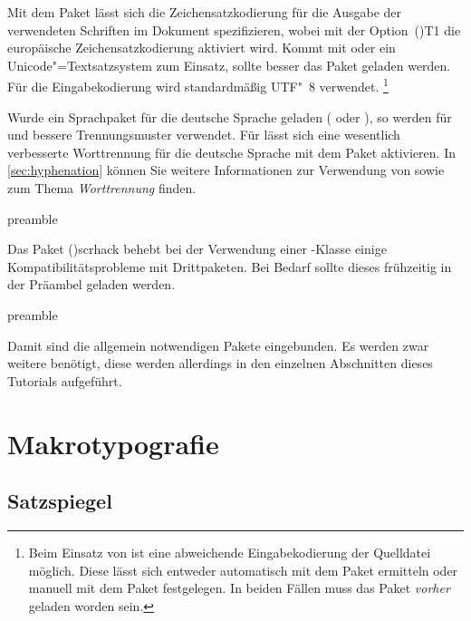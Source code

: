 \documentclass[%
  english,ngerman,%
  cdgeometry=no,DIV=12,%
  cd=false,cdfont=false,cdtitle=true,%
  headings=normal,%
  automark,%
  listof=toc,%
]{tudscrartcl}
\begin{document}
Mit dem Paket  lässt sich die Zeichensatzkodierung für die 
Ausgabe der verwendeten Schriften im Dokument spezifizieren, wobei mit der 
Option~\Option(){T1} die europäische Zeichensatzkodierung 
aktiviert wird. Kommt mit  oder  ein 
Unicode"=Textsatzsystem zum Einsatz, sollte besser das Paket  
geladen werden. Für die Eingabekodierung wird standardmäßig UTF"~8 verwendet.%
\footnote{%
  Beim Einsatz von  ist eine abweichende Eingabekodierung der 
  Quelldatei möglich. Diese lässt sich entweder automatisch mit dem Paket 
   ermitteln oder manuell mit dem Paket  
  festgelegen. In beiden Fällen muss das Paket  \emph{vorher} 
  geladen worden sein.
} 

Wurde ein Sprachpaket für die deutsche Sprache geladen ( oder 
), so werden für  und  
bessere Trennungsmuster verwendet. Für  lässt sich eine 
wesentlich verbesserte Worttrennung für die deutsche Sprache mit dem Paket 
 aktivieren. In \autoref{sec:hyphenation} können Sie weitere 
Informationen zur Verwendung von  sowie zum Thema 
\emph{Worttrennung} finden.
%
\begin{Code}{preamble}
\usepackage{iftex}
\iftutex
  \usepackage{fontspec}
\else
  \usepackage[T1]{fontenc}
  \usepackage[ngerman=ngerman-x-latest]{hyphsubst}
\fi
\end{Code}

Das Paket \Package(){scrhack} behebt bei der Verwendung 
einer \KOMAScript-Klasse einige Kompatibilitätsprobleme mit Drittpaketen.
Bei Bedarf sollte dieses frühzeitig in der Präambel geladen werden. 
%
\begin{Code}{preamble}
\usepackage{scrhack}
\end{Code}

Damit sind die allgemein notwendigen Pakete eingebunden. Es werden zwar weitere 
benötigt, diese werden allerdings in den einzelnen Abschnitten dieses Tutorials 
aufgeführt.



\section{Makrotypografie}
\subsection{Satzspiegel}
\end{document}
